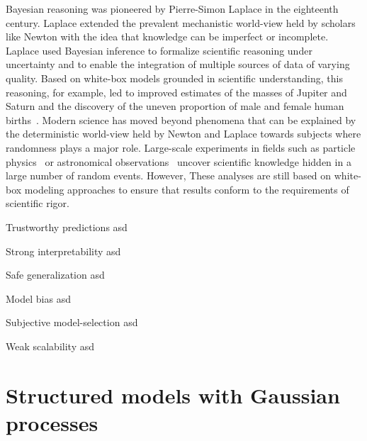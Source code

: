 Bayesian reasoning was pioneered by Pierre-Simon Laplace in the eighteenth century.
Laplace extended the prevalent mechanistic world-view held by scholars like Newton with the idea that knowledge can be imperfect or incomplete.
Laplace used Bayesian inference to formalize scientific reasoning under uncertainty and to enable the integration of multiple sources of data of varying quality.
Based on white-box models grounded in scientific understanding, this reasoning, for example, led to improved estimates of the masses of Jupiter and Saturn and the discovery of the uneven proportion of male and female human births~\parencite{pulskamp_laplace_2020,laplace_theorie_1820}.
Modern science has moved beyond phenomena that can be explained by the deterministic world-view held by Newton and Laplace towards subjects where randomness plays a major role.
Large-scale experiments in fields such as particle physics~\parencite{khachatryan_observation_2015} or astronomical observations~\parencite{collaboration_first_2019,the_ligo_scientific_collaboration_observation_2016} uncover scientific knowledge hidden in a large number of random events.
However, These analyses are still based on white-box modeling approaches to ensure that results conform to the requirements of scientific rigor.


\begin{Pros}
    \begin{compactdesc}
        \item[Trustworthy predictions] asd
        \item[Strong interpretability] asd
        \item[Safe generalization] asd
    \end{compactdesc}
\end{Pros}
\begin{Cons}
    \begin{compactdesc}
        \item[Model bias] asd
        \item[Subjective model-selection] asd
        \item[Weak scalability] asd
    \end{compactdesc}
\end{Cons}


\section{Structured models with Gaussian processes}

